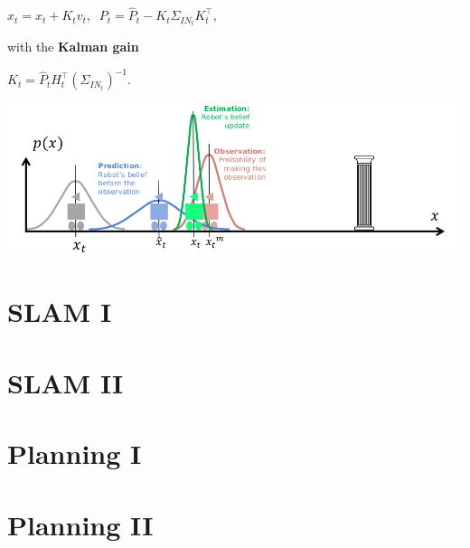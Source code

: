 \documentclass[landscape]{article}
\begin{document}
\begin{multicols}{3}
\begin{minipage}{\columnwidth}
\begin{compactenum}
    \begin{center}
      $
      x_t = \hat x_t + K_t v_t,\;\;
      P_t = \hat P_t - K_t \Sigma_{IN_t}K_t^\intercal,
      $
    \end{center}

    with the \textbf{Kalman gain}

    \begin{center}
      $
      K_t = \hat P_t H_t^\intercal (\Sigma_{IN_t})^{-1}.
      $
    \end{center}

  \end{compactenum}
  \includegraphics[width=\columnwidth]{img/9_Kalman.png}
\end{minipage}


\vfill

\section{SLAM I}

\blindtext[3]

\vfill

\section{SLAM II}

\blindtext[3]

\vfill

\section{Planning I}

\blindtext[3]

\vfill

\section{Planning II}

\blindtext[3]






\end{multicols}
\end{document}
